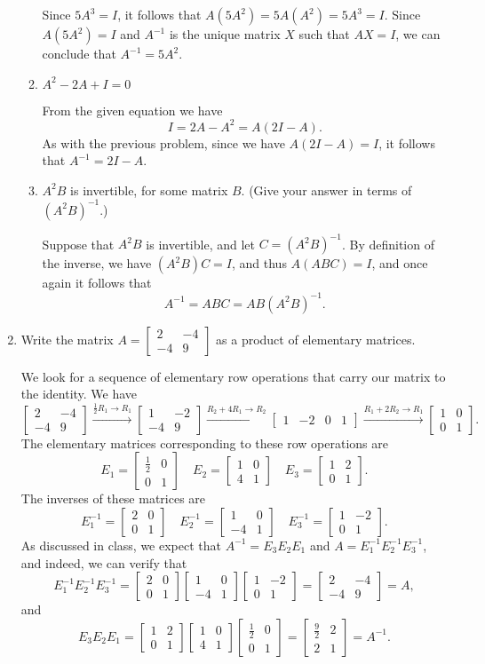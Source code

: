 \documentclass[12pt]{article}
\newcommand{\bbm}{\begin{bmatrix}}
\newcommand{\ebm}{\end{bmatrix}}
\begin{document}
\begin{enumerate}
\begin{enumerate}
\bigskip

Since $5A^3=I$, it follows that $A(5A^2) = 5A(A^2) = 5A^3 = I$. Since $A(5A^2)=I$ and $A^{-1}$ is the unique matrix $X$ such that $AX=I$, we can conclude that $A^{-1}=5A^2$.

\medskip

 \item $A^2-2A+I=0$

\bigskip

From the given equation we have
\[
 I = 2A-A^2 =A(2I-A).
\]
As with the previous problem, since we have $A(2I-A)=I$, it follows that $A^{-1} = 2I-A$.

\medskip


 \item $A^2B$ is invertible, for some matrix $B$. (Give your answer in terms of $(A^2B)^{-1}$.)

\bigskip

Suppose that $A^2B$ is invertible, and let $C=(A^2B)^{-1}$. By definition of the inverse, we have $(A^2B)C=I$, and thus $A(ABC)=I$, and once again it follows that
\[
 A^{-1} = ABC = AB(A^2B)^{-1}.
\]

\end{enumerate}

\medskip


\item Write the matrix $A=\bbm 2&-4\\-4&9\ebm$ as a product of elementary matrices.

\bigskip

We look for a sequence of elementary row operations that carry our matrix to the identity. We have
\[
 \bbm 2&-4\\-4&9\ebm \xrightarrow{\frac{1}{2}R_1\to R_1}\bbm 1&-2\\-4&9\ebm \xrightarrow{R_2+4R_1\to R_2} \bbm 1&-2&0&1\ebm \xrightarrow{R_1+2R_2\to R_1} \bbm 1&0\\0&1\ebm.
\]
The elementary matrices corresponding to these row operations are
\[
 E_1 =\bbm \frac{1}{2}&0\\0&1\ebm\quad E_2 = \bbm 1&0\\4&1\ebm \quad E_3 = \bbm 1&2\\0&1\ebm.
\]
The inverses of these matrices are
\[
 E_1^{-1} = \bbm 2&0\\0&1\ebm \quad E_2^{-1} = \bbm 1&0\\-4&1\ebm \quad E_3^{-1} = \bbm 1&-2\\0&1\ebm.
\]
As discussed in class, we expect that $A^{-1} = E_3E_2E_1$ and $A = E_1^{-1}E_2^{-1}E_3^{-1}$, and indeed, we can verify that
\[
 E_1^{-1}E_2^{-1}E_3^{-1} = \bbm 2&0\\0&1\ebm\bbm 1&0\\-4&1\ebm\bbm 1&-2\\0&1\ebm = \bbm 2&-4\\-4&9\ebm = A,
\]
and
\[
 E_3E_2E_1 = \bbm 1&2\\0&1\ebm\bbm 1&0\\4&1\ebm\bbm \frac{1}{2}&0\\0&1\ebm = \bbm \frac{9}{2}&2\\2&1\ebm = A^{-1}.
\]


 \end{enumerate}
\end{document}
